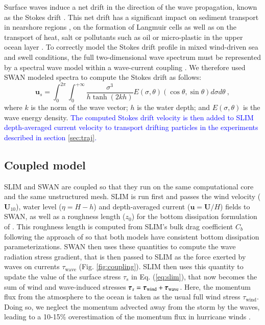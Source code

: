 \documentclass[preprint,12pt,authoryear]{elsarticle}
\newcommand{\modif}[1]{\textcolor{blue}{#1}}
\begin{document}
Surface waves induce a net drift in the direction of the wave propagation, known as the Stokes drift \citep{van2018stokes,stokes1880theory}. This net drift has a significant impact on sediment transport in nearshore regions \citep{hoefel2003wave}, on the formation of Langmuir cells \citep{langmuir1938surface, craik1976rational} as well as on the transport of heat, salt or pollutants such as oil or micro-plastic in the upper ocean layer \citep{mcwilliams2000vertical,rohrs2012observation,drivdal2014wave}. To correctly model the Stokes drift profile in mixed wind-driven sea and swell conditions, the full two-dimensional wave spectrum must be represented by a spectral wave model within a wave-current coupling \citep{van2018stokes}. We therefore used SWAN modeled spectra to compute the Stokes drift as follows:
\begin{equation}
    \mathbf{u}_{s} = \int_0^{2\pi}\int_0^{+\infty} \dfrac{\sigma^3}{h\tanh(2kh)}E(\sigma,\theta)(\cos\theta, \sin\theta)d\sigma d\theta~, \label{eq:stokes}
\end{equation}
where $k$ is the norm of the wave vector; $h$ is the water depth; and $E(\sigma,\theta)$ is the wave energy density. \modif{The computed Stokes drift velocity is then added to SLIM depth-averaged current velocity to transport drifting particles in the experiments described in section \ref{sec:traj}.}

\subsection{Coupled model}

SLIM and SWAN are coupled so that they run on the same computational core and the same unstructured mesh. SLIM is run first and passes the wind velocity ($\mathbf{U}_{10}$), water level ($\eta=H-h$) and depth-averaged current ($\mathbf{u}=\mathbf{U}/H$) fields to SWAN, as well as a roughness length ($z_0$) for the bottom dissipation formulation of \cite{madsen1989spectral}. This roughness length is computed from SLIM's bulk drag coefficient $C_b$ following the approach of \cite{dietrich2011hurricane} so that both models have consistent bottom dissipation parameterizations. SWAN then uses these quantities to compute the wave radiation stress gradient, that is then passed to SLIM as the force exerted by waves on currents {\boldmath$\tau$}$_\text{wave}$ (Fig. \ref{fig:coupling}). SLIM then uses this quantity to update the value of the surface stress {\boldmath$\tau$}$_s$ in Eq. (\ref{eq:slim}), that now becomes the sum of wind and wave-induced stresses $\text{\boldmath$\tau$}_s = \text{\boldmath$\tau$}_\text{wind}+\text{\boldmath$\tau$}_\text{wave}$. Here, the momentum flux from the atmosphere to the ocean is taken as the usual full wind stress {\boldmath$\tau$}$_\text{wind}$. Doing so, we neglect the momentum advected away from the storm by the waves, leading to a 10-15\% overestimation of the momentum flux in hurricane winds \citep{curcic2015explicit}.
\end{document}
